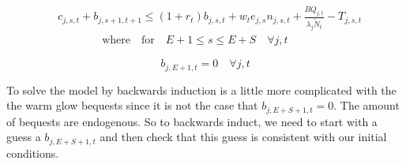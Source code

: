 \documentclass[letterpaper,12pt]{article}
\theoremstyle{definition}
\begin{document}
    
        \begin{equation}\label{EqBC}
      \begin{split}
        &c_{j,s,t} + b_{j,s+1,t+1} \leq \left(1 + r_t\right) b_{j,s,t} + w_t e_{j,s}n_{j,s,t} + \frac{BQ_{j,t}}{\lambda_j\tilde{N}_t} - T_{j,s,t} \\
        &\qquad\qquad\text{where}\quad\text{for} \quad E+1\leq s \leq E+S \quad \forall j,t
      \end{split}
    \end{equation}
    
    \begin{equation}\label{InitialWealth}
     b_{j,E+1,t} = 0 \quad\forall j,t
    \end{equation}
    
   
   To solve the model by backwards induction is a little more complicated with the the warm glow bequests since it is not the case that $b_{j,E+S+1,t}=0$.  The amount of bequests are endogenous.  So to backwards induct, we need to start with a guess a $b_{j,E+S+1,t}$ and then check that this guess is consistent with our initial conditions.  
   
\end{document}
